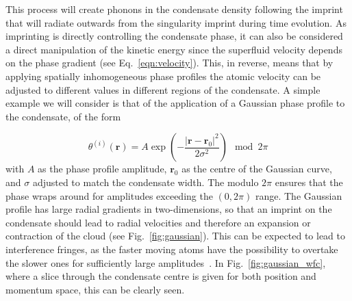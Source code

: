 This process will create phonons in the condensate density following the imprint that will radiate outwards from the singularity imprint during time evolution. As imprinting is directly controlling the condensate phase, it can also be considered a direct manipulation of the kinetic energy since the superfluid velocity depends on the phase gradient (see Eq.~\eqref{eqn:velocity}). This, in reverse, means that by applying spatially inhomogeneous phase profiles the atomic velocity can be adjusted to different values in different regions of the condensate. A simple example we will consider is that of the application of a Gaussian phase profile to the condensate, of the form

\begin{equation}
    \theta^{(i)}(\mathbf{r}) = A\exp\left( -\frac{ |\mathbf{r}-\mathbf{r}_0|^2 }{2\sigma^2 } \right) \mod 2\pi
\end{equation}
with $A$ as the phase profile amplitude, $\mathbf{r}_0$ as the centre of the Gaussian curve, and $\sigma$ adjusted to match the condensate width. The modulo $2\pi$ ensures that the phase wraps around for amplitudes exceeding the $(0,2\pi)$ range. The Gaussian profile has large radial gradients in two-dimensions, so that an imprint on the condensate should lead to radial velocities and therefore an expansion or contraction of the cloud (see Fig.~\ref{fig:gaussian}). This can be expected to lead to interference fringes, as the faster moving atoms have the possibility to overtake the slower ones for sufficiently large amplitudes~\cite{BEC:Busch_pra_2002}. In Fig.~\ref{fig:gaussian_wfc}, where a slice through the condensate centre is given for both position and momentum space, this can be clearly seen.

